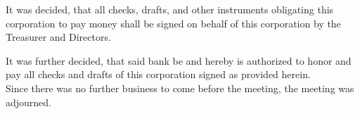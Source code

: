 \documentclass{article}
\begin{document}
	It was decided, that all checks, drafts, and other instruments obligating this corporation to pay money shall be signed on behalf of this corporation by the Treasurer and Directors.
	
	It was further decided, that said bank be and hereby is authorized to honor and pay all checks and drafts of this corporation signed as provided herein.\\
	
	\noindent Since there was no further business to come before the meeting, the meeting was adjourned.
	
	\vspace{1cm}
	\noindent \makebox[\textwidth][l]{
		\makebox[9cm][l] {\hrulefill} \hfill 
		\makebox[5cm][l] {\hrulefill} 
	}
	\noindent {}
	
\end{document}
